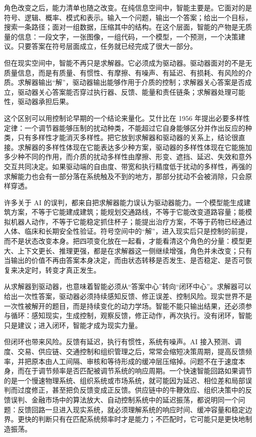 角色改变之后，能力清单也随之改变。在纯信息空间中，智能主要是。它面对的是符号、逻辑、概率、模式和表示。输入一个问题，输出一个答案；给出一个目标，搜索一条路径；面对一组数据，压缩其中的结构。在这个层面，智能的产物是无质量的信息：一段文字，一张图像，一组代码，一个模型，一个预测，一个决策建议。只要答案在符号层面成立，任务就已经完成了很大一部分。

但在现实空间中，智能不再只是求解器。它必须成为驱动器。驱动器面对的不是无质量信息，而是有质量、有惯性、有摩擦、有噪声、有延迟、有损耗、有风险的介质。求解器输出“解”，驱动器输出能够作用于介质的控制；求解器关心答案是否成立，驱动器关心答案能否穿过执行器、反馈、能量和责任链条；求解器处理可能性，驱动器承担后果。

这个区别可以用控制论早期的一个结论来量化。艾什比在 1956 年提出必要多样性定律：一个调节器能够压制的扰动种类，不能超过它自身能够区分并作出反应的种类，只有多样性才能消灭多样性\cite{ashby1956cybernetics}。把它放到求解器和驱动器的关系上，结论很直接。求解器的多样性体现在它能表达多少种方案，驱动器的多样性体现在它能施加多少种不同的作用，而介质的扰动多样性由摩擦、形变、遮挡、延迟、失效和意外交互共同决定。如果驱动端的自由度、带宽和执行精度低于扰动的多样性，再强的求解能力也会有一部分落在系统触及不到的地方，那部分扰动不会被消除，只会原样穿透。

许多关于 AI 的误判，都来自把求解器能力误认为驱动器能力。一个模型能生成建筑方案，不等于它能建成建筑；能规划交通路线，不等于它能改变道路容量；能模拟机器人动作，不等于它能稳定抓住杯子；能提出治疗方案，不等于药物已经通过人体、临床和长期安全性验证。符号空间中的“解”，进入现实后只是控制的前提，而不是状态改变本身。把四项变化放在一起看，才能看清这个角色的分量：模型更大、上下文更长、推理更强，都是在求解器这一侧继续增强，角色并未改变；只有当输出的价值不再由答案本身决定，而由状态转移是否发生、是否稳定、是否可恢复来决定时，转变才真正发生。


从求解器到驱动器，也意味着智能必须从“答案中心”转向“闭环中心”。求解器可以给出一次性答案，驱动器必须持续感知反馈、修正误差、控制风险。现实世界不是一次性被解开的题目，而是持续变化的动力学场。智能不能只输出结果，还必须参与循环：感知现实，生成控制，观察反馈，修正动作，再次执行。没有闭环，智能只是建议；进入闭环，智能才成为现实力量。

但闭环也带来风险。反馈有延迟，执行有惯性，系统有噪声。AI 接入预测、调度、交易、供应链、交通控制和组织管理之后，常常会缩短决策周期，提高反馈频率，并把原本由人工间隔、审核和等待形成的缓冲层压缩掉。问题不在于速度本身，而在于调节频率是否匹配被调节系统的响应周期。一个快速智能回路如果调节的是一个慢速物理系统、组织系统或市场系统，就可能因为延迟、相位差和局部误判而过度修正，甚至把负反馈变成正反馈。供应链中的牛鞭效应、组织决策中的反馈误判、金融市场中的算法放大、自动控制系统中的延迟振荡，都说明同一个问题：反馈回路一旦进入现实系统，就必须理解系统的响应时间、缓冲容量和稳定边界。更快的判断只有在匹配系统频率时才是能力；不匹配时，它可能只是更快地制造振荡。\cite{lee1997,sterman1989}

